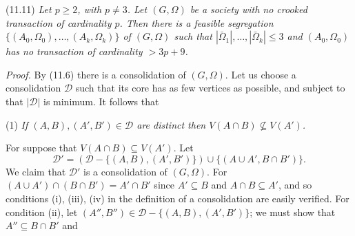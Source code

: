 \stmt
(11.11) \textit{Let $p \ge 2$, with $p \neq 3$. Let $(G, \Omega)$ be a society with no crooked transaction of cardinality $p$. Then there is a feasible segregation $\{(A_0, \Omega_0), \dots, (A_k, \Omega_k)\}$ of $(G, \Omega)$ such that $|\bar{\Omega}_1|, \dots, |\bar{\Omega}_k| \le 3$ and $(A_0, \Omega_0)$ has no transaction of cardinality $> 3p + 9$.}

\textit{Proof.} By (11.6) there is a consolidation of $(G, \Omega)$. Let us choose a consolidation $\mathcal{D}$ such that its core has as few vertices as possible, and subject to that $|\mathcal{D}|$ is minimum. It follows that

\hspace*{12pt}(1) \textit{If $(A, B), (A', B') \in \mathcal{D}$ are distinct then $V(A \cap B) \not\subseteq V(A')$.}

For suppose that $V(A \cap B) \subseteq V(A')$. Let
\begin{equation*}
\mathcal{D}' = (\mathcal{D} - \{(A, B), (A', B')\}) \cup \{(A \cup A', B \cap B')\}.
\end{equation*}
We claim that $\mathcal{D}'$ is a consolidation of $(G, \Omega)$. For $(A \cup A') \cap (B \cap B') = A' \cap B'$ since $A' \subseteq B$ and $A \cap B \subseteq A'$, and so conditions (i), (iii), (iv) in the definition of a consolidation are easily verified. For condition (ii), let $(A'', B'') \in \mathcal{D} - \{(A, B), (A', B')\}$; we must show that $A'' \subseteq B \cap B'$ and
